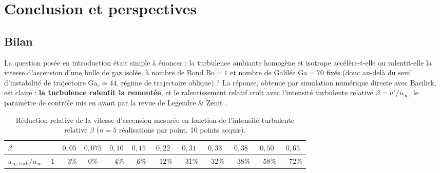 \section{Conclusion et perspectives}

\subsection{Bilan}

La question posée en introduction était simple à énoncer : la turbulence ambiante
homogène et isotrope accélère-t-elle ou ralentit-elle la vitesse d'ascension d'une
bulle de gaz isolée, à nombre de Bond $\mathrm{Bo}=1$ et nombre de Galilée
$\mathrm{Ga}=70$ fixés (donc au-delà du seuil d'instabilité de trajectoire
$\mathrm{Ga}_c\simeq44$, régime de trajectoire oblique) ? La réponse, obtenue par
simulation numérique directe avec Basilisk, est claire : \textbf{la
turbulence ralentit la remontée}, et le ralentissement relatif croît avec
l'intensité turbulente relative $\beta=u'/u_\infty$, le paramètre de contrôle mis
en avant par la revue de Legendre \& Zenit \cite{legendre2025}.

\begin{table}[H]
    \centering
    \renewcommand{\arraystretch}{1.3}
    \small
    \begin{tabular}{lcccccccccc}
        \toprule
        $\beta$ & $0{,}05$ & $0{,}075$ & $0{,}10$ & $0{,}15$ & $0{,}22$ & $0{,}31$ & $0{,}33$ & $0{,}38$ & $0{,}50$ & $0{,}65$ \\
        \midrule
        $u_{\infty,\mathrm{turb}}/u_\infty - 1$ & $-3\%$ & $0\%$ & $-4\%$ & $-6\%$ & $-12\%$ & $-31\%$ & $-32\%$ & $-38\%$ & $-58\%$ & $-72\%$ \\
        \bottomrule
    \end{tabular}
    \caption{Réduction relative de la vitesse d'ascension mesurée en fonction de
    l'intensité turbulente relative $\beta$ ($n=5$ réalisations par point, 10 points acquis).}
    \label{tab:bilan_beta}
\end{table}


